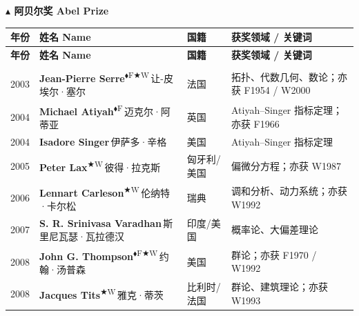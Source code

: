 \documentclass[a4paper,10pt]{article}
\newcommand{\Fbadge}{\textsuperscript{\normalfont\scriptsize\sffamily\color{fieldsclr}$\blacklozenge$F}}
\newcommand{\Wbadge}{\textsuperscript{\normalfont\scriptsize\sffamily\color{wolfclr}$\bigstar$W}}
\begin{document}
\begin{center}{\Large\bfseries\sffamily\color{abelclr} $\blacktriangle$ 阿贝尔奖 Abel Prize}\end{center}
\vspace{0.3em}
\begin{longtable}{
  >{\raggedright}m{1.4cm}
  >{\raggedright}m{7.0cm}
  >{\raggedright}m{4.5cm}
  >{\raggedright\arraybackslash}m{9.5cm}
}
\toprule
\rowcolor{headerbg}
\textbf{\sffamily 年份} & \textbf{\sffamily 姓名 Name} & \textbf{\sffamily 国籍} & \textbf{\sffamily 获奖领域 / 关键词} \\
\midrule
\endfirsthead
\toprule
\rowcolor{headerbg}
\textbf{\sffamily 年份} & \textbf{\sffamily 姓名 Name} & \textbf{\sffamily 国籍} & \textbf{\sffamily 获奖领域 / 关键词} \\
\midrule
\endhead
\midrule
\multicolumn{4}{r}{\small\itshape 续下页 \ldots} \\
\endfoot
\bottomrule
\endlastfoot
{\color{yearcolor}2003} & {\bfseries Jean-Pierre Serre}\Fbadge\Wbadge\,{\small\color{mutedgray}让-皮埃尔·塞尔} & 法国 & {\small\color{fieldcolor}拓扑、代数几何、数论；亦获 F1954 / W2000} \\[2pt]
{\color{yearcolor}2004} & {\bfseries Michael Atiyah}\Fbadge\,{\small\color{mutedgray}迈克尔·阿蒂亚} & 英国 & {\small\color{fieldcolor}Atiyah–Singer 指标定理；亦获 F1966} \\[2pt]
{\color{yearcolor}2004} & {\bfseries Isadore Singer}\,{\small\color{mutedgray}伊萨多·辛格} & 美国 & {\small\color{fieldcolor}Atiyah–Singer 指标定理} \\[2pt]
{\color{yearcolor}2005} & {\bfseries Peter Lax}\Wbadge\,{\small\color{mutedgray}彼得·拉克斯} & 匈牙利/美国 & {\small\color{fieldcolor}偏微分方程；亦获 W1987} \\[2pt]
{\color{yearcolor}2006} & {\bfseries Lennart Carleson}\Wbadge\,{\small\color{mutedgray}伦纳特·卡尔松} & 瑞典 & {\small\color{fieldcolor}调和分析、动力系统；亦获 W1992} \\[2pt]
{\color{yearcolor}2007} & {\bfseries S. R. Srinivasa Varadhan}\,{\small\color{mutedgray}斯里尼瓦瑟·瓦拉德汉} & 印度/美国 & {\small\color{fieldcolor}概率论、大偏差理论} \\[2pt]
{\color{yearcolor}2008} & {\bfseries John G. Thompson}\Fbadge\Wbadge\,{\small\color{mutedgray}约翰·汤普森} & 美国 & {\small\color{fieldcolor}群论；亦获 F1970 / W1992} \\[2pt]
{\color{yearcolor}2008} & {\bfseries Jacques Tits}\Wbadge\,{\small\color{mutedgray}雅克·蒂茨} & 比利时/法国 & {\small\color{fieldcolor}群论、建筑理论；亦获 W1993} \\[2pt]

\end{longtable}
\end{document}
